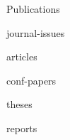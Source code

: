 \documentclass{article}
\begin{document}
\begin{cv}
\begin{cvlist}{Publications}
\item[Edited Journal Issues]
  \begin{btSect}{journal-issues}
    \btPrintAll
  \end{btSect}

\item[Ref.~Jour.~Papers]
  \begin{btSect}{articles}
    \btPrintAll
  \end{btSect}

\item[Ref.~Conf.~Papers]
  \begin{btSect}{conf-papers}
    \btPrintAll
  \end{btSect}

\item[Theses]
  \begin{btSect}{theses}
    \btPrintAll
  \end{btSect}

\item[Reports]
  \begin{btSect}{reports}
    \btPrintAll
  \end{btSect}

\end{cvlist}


\end{cv}
\end{document}
